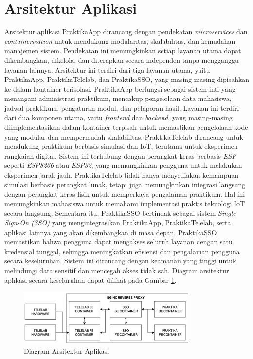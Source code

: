 \section{Arsitektur Aplikasi}
Arsitektur aplikasi PraktikaApp dirancang dengan pendekatan \emph{microservices} dan \emph{containerization} untuk mendukung modularitas, skalabilitas, dan kemudahan manajemen sistem. Pendekatan ini memungkinkan setiap layanan utama dapat dikembangkan, dikelola, dan diterapkan secara independen tanpa mengganggu layanan lainnya. Arsitektur ini terdiri dari tiga layanan utama, yaitu PraktikaApp, PraktikaTelelab, dan PraktikaSSO, yang masing-masing dipisahkan ke dalam kontainer terisolasi. PraktikaApp berfungsi sebagai sistem inti yang menangani administrasi praktikum, mencakup pengelolaan data mahasiswa, jadwal praktikum, pengaturan modul, dan pelaporan hasil. Layanan ini terdiri dari dua komponen utama, yaitu \emph{frontend} dan \emph{backend}, yang masing-masing diimplementasikan dalam kontainer terpisah untuk memastikan pengelolaan kode yang modular dan mempermudah skalabilitas.  
PraktikaTelelab dirancang untuk mendukung praktikum berbasis simulasi dan IoT, terutama untuk eksperimen rangkaian digital. Sistem ini terhubung dengan perangkat keras berbasis \emph{ESP} seperti \emph{ESP8266} atau \emph{ESP32}, yang memungkinkan pengguna untuk melakukan eksperimen jarak jauh. PraktikaTelelab tidak hanya menyediakan kemampuan simulasi berbasis perangkat lunak, tetapi juga memungkinkan integrasi langsung dengan perangkat keras fisik untuk memperkaya pengalaman praktikum. Hal ini memungkinkan mahasiswa untuk memahami implementasi praktis teknologi IoT secara langsung. Sementara itu, PraktikaSSO bertindak sebagai sistem \emph{Single Sign-On (SSO)} yang mengintegrasikan PraktikaApp, PraktikaTelelab, serta aplikasi lainnya yang akan dikembangkan di masa depan. PraktikaSSO memastikan bahwa pengguna dapat mengakses seluruh layanan dengan satu kredensial tunggal, sehingga meningkatkan efisiensi dan pengalaman pengguna secara keseluruhan. Sistem ini dirancang dengan keamanan yang tinggi untuk melindungi data sensitif dan mencegah akses tidak sah. Diagram arsitektur aplikasi secara keseluruhan dapat dilihat pada Gambar \ref{fig:app_architecture}.

\begin{figure}[H]
    \centering
    \includegraphics[width=0.8\textwidth]{gambar/app_architecture.png}
    \caption{Diagram Arsitektur Aplikasi}
    \label{fig:app_architecture}
\end{figure}


